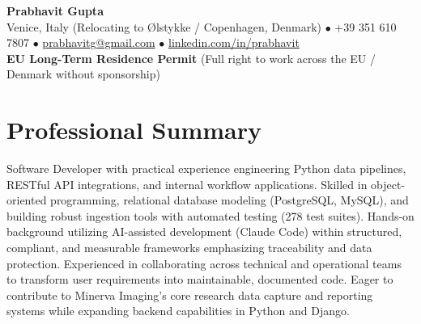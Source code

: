 \documentclass[10pt,a4paper]{article}
\begin{document}
\begin{center}
    {\Huge \bfseries \color{primary} Prabhavit Gupta} \\[4pt]
    \small \color{darkgray}
    Venice, Italy (Relocating to Ølstykke / Copenhagen, Denmark) \enspace $\bullet$ \enspace
    +39 351 610 7807 \enspace $\bullet$ \enspace
    \href{mailto:prabhavitg@gmail.com}{prabhavitg@gmail.com} \enspace $\bullet$ \enspace
    \href{https://www.linkedin.com/in/prabhavit/}{linkedin.com/in/prabhavit} \\[2pt]
    \textbf{EU Long-Term Residence Permit} (Full right to work across the EU / Denmark without sponsorship)
\end{center}

\vspace{-4pt}

\section*{Professional Summary}
\small
Software Developer with practical experience engineering Python data pipelines, RESTful API integrations, and internal workflow applications. Skilled in object-oriented programming, relational database modeling (PostgreSQL, MySQL), and building robust ingestion tools with automated testing (278 test suites). Hands-on background utilizing AI-assisted development (Claude Code) within structured, compliant, and measurable frameworks emphasizing traceability and data protection. Experienced in collaborating across technical and operational teams to transform user requirements into maintainable, documented code. Eager to contribute to Minerva Imaging's core research data capture and reporting systems while expanding backend capabilities in Python and Django.

\end{document}
